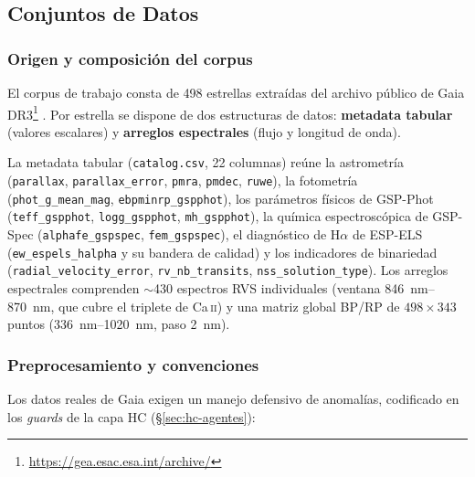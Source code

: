 \subsection{Conjuntos de Datos}
\label{sec:datos}

\subsubsection{Origen y composición del corpus}
\label{sec:datos-origen}

El corpus de trabajo consta de \num{498} estrellas extraídas del archivo público de
Gaia DR3\footnote{\url{https://gea.esac.esa.int/archive/}} \citep{gaiadr3}. Por
estrella se dispone de dos estructuras de datos: \textbf{metadata tabular} (valores
escalares) y \textbf{arreglos espectrales} (flujo y longitud de onda).

La metadata tabular (\texttt{catalog.csv}, 22 columnas) reúne la astrometría
(\verb|parallax|, \verb|parallax_error|, \verb|pmra|, \verb|pmdec|, \verb|ruwe|), la
fotometría (\verb|phot_g_mean_mag|, \verb|ebpminrp_gspphot|), los parámetros físicos
de GSP-Phot (\verb|teff_gspphot|, \verb|logg_gspphot|, \verb|mh_gspphot|), la química
espectroscópica de GSP-Spec (\verb|alphafe_gspspec|, \verb|fem_gspspec|), el
diagnóstico de H$\alpha$ de ESP-ELS (\verb|ew_espels_halpha| y su bandera de calidad)
y los indicadores de binariedad (\verb|radial_velocity_error|, \verb|rv_nb_transits|,
\verb|nss_solution_type|). Los arreglos espectrales comprenden $\sim$430 espectros
RVS individuales (ventana \SIrange{846}{870}{\nano\meter}, que cubre el triplete de
Ca\,\textsc{ii}) y una matriz global BP/RP de $498\times343$ puntos
(\SIrange{336}{1020}{\nano\meter}, paso \SI{2}{\nano\meter}).

\subsubsection{Preprocesamiento y convenciones}
\label{sec:datos-preproc}

Los datos reales de Gaia exigen un manejo defensivo de anomalías, codificado en los
\emph{guards} de la capa HC (§\ref{sec:hc-agentes}):

